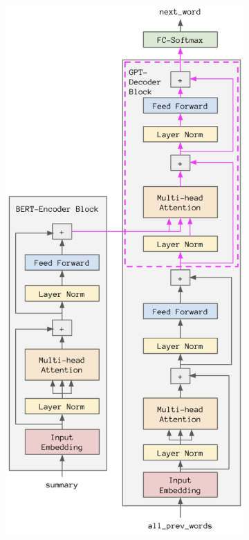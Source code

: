 \documentclass{article}
\begin{document}
\begin{figure}[h]
    \centering
    \begin{subfigure}[t]{0.5\textwidth}
        \centering
        \includegraphics[scale=0.55]{bergpt.png}

\end{subfigure}
\end{figure}
\end{document}
